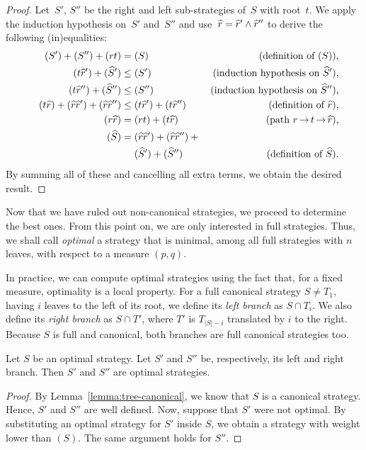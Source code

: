 \documentclass[jmc]{degruyter-journal-a}
\theoremstyle{definition}
\def\abs#1{\left|#1\right|}
\begin{document}
\begin{proof}
Let~$S'$, $S''$ be the right and left sub-strategies of~$S$ with
root~$t$. We apply the induction hypothesis on~$S'$ and~$S''$ and
use~$\widehat{r} = \widehat{r}' \wedge \widehat{r}''$ to derive the following (in)equalities:
\begin{align*}
(S') + (S'') + (rt) &= (S)
  & \text{(definition of~$(S)$),}\\
(t\widehat{r}') + (\widehat{S}') &\leq (S')
  & \text{(induction hypothesis on~$\widehat{S}'$),}\\
(t\widehat{r}'') + (\widehat{S}'') &\leq (S'')
  & \text{(induction hypothesis on~$\widehat{S}''$),} \\
\quad (t\widehat{r})+ (\widehat{r}\widehat{r}') + (\widehat{r}\widehat{r}'') & \leq  (t\widehat{r}') + (t\widehat{r}'')
  & \text{(definition of~$\widehat{r}$),}\\
(r\widehat{r}) &= (rt) + (t\widehat{r})
  & \text{(path $r \mathop{\rightarrow} t \mathop{\rightarrow} \widehat{r}$),}\\
(\widehat{S}) &= (\widehat{r}\widehat{r}') + (\widehat{r}\widehat{r}'') + {} & \\
& \quad\ (\widehat{S}') + (\widehat{S}'')
  & \text{(definition of~$\widehat{S}$).}
\end{align*}
By summing all of these and cancelling all extra terms, we obtain the
desired result.
\end{proof}

Now that we have ruled out non-canonical strategies, we proceed to
determine the best ones. From this point on, we are only interested in
full strategies. Thus, we shall call \emph{optimal} a strategy that is
minimal, among all full strategies with $n$ leaves, with respect to a
measure $(p,q)$.

In practice, we can compute optimal strategies using the fact that,
for a fixed measure, optimality is a local property. For a full
canonical strategy $S\ne T_1$, having $i$ leaves to the left of its
root, we define its \emph{left branch} as $S \cap T_i$. We also define
its \emph{right branch} as $S \cap T'$, where $T'$ is $T_{\abs{S}-i}$
translated by $i$ to the right. Because $S$ is full and canonical,
both branches are full canonical strategies too.

\begin{lemma}\label{lem:cost}
  Let $S$ be an optimal strategy. Let $S'$ and $S''$ be, respectively,
  its left and right branch. Then $S'$ and $S''$ are optimal
  strategies.
\end{lemma}
\begin{proof}
  By Lemma~\ref{lemma:tree-canonical}, we know that $S$ is a canonical
  strategy. Hence, $S'$ and $S''$ are well defined.  Now, suppose that
  $S'$ were not optimal. By substituting an optimal strategy for $S'$
  inside $S$, we obtain a strategy with weight lower than $(S)$. The
  same argument holds for $S''$.
\end{proof}
\end{document}
